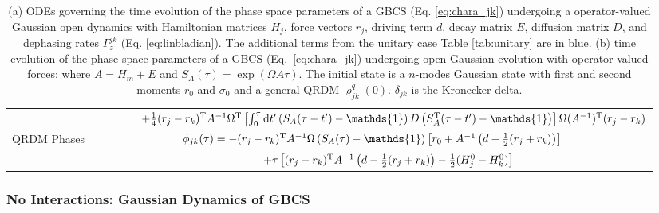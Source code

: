 \documentclass[%
reprint,
superscriptaddress,
nofootinbib,
 amsmath,amssymb,
prx,
floatfix,
]{revtex4-2}
\begin{document}
\begin{table}[!]
\begin{tabular}{ |p{3.8cm}|P{7cm}|P{7cm}|}
 &  \\ 
     QRDM Phases  &  \\
 &  \\
 \hline%
    \end{tabular}
    \caption{(a) ODEs governing the time evolution of the phase space parameters of a GBCS (Eq. \ref{eq:chara_jk}) undergoing a operator-valued Gaussian open dynamics with Hamiltonian matrices $H_j$, force vectors $r_j$, driving term $d$, decay matrix $E$, diffusion matrix $D$, and dephasing rates $\Gamma_z^{jk}$ (Eq. \ref{eq:linbladian}). The additional terms from the unitary case Table \ref{tab:unitary} are in blue. (b) time evolution of the phase space parameters of a GBCS (Eq.~\ref{eq:chara_jk}) undergoing open Gaussian evolution with operator-valued forces: where $A = H_m + E$ and $S_A (\tau) = \exp (  \Omega A \tau)$. The initial state is a $n$-modes Gaussian state with first and second moments $r_0$ and $\sigma_0$ and a general QRDM $\varrho^{q}_{jk}(0)$. $\delta_{jk}$ is the Kronecker delta.}
    \label{tab:open}
\end{table}
 
\subsubsection{No Interactions: Gaussian Dynamics of GBCS}
\end{document}
